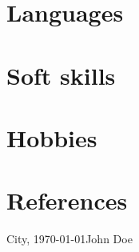 \documentclass[10pt,a4paper,sans]{moderncv}
\begin{document}
    \section{Languages}
    \section{Soft skills}
    \section{Hobbies}
    \section{References}
    \vspace{3cm}
    \hspace{2cm}City, \today \hspace{5cm}John Doe
\end{document}
